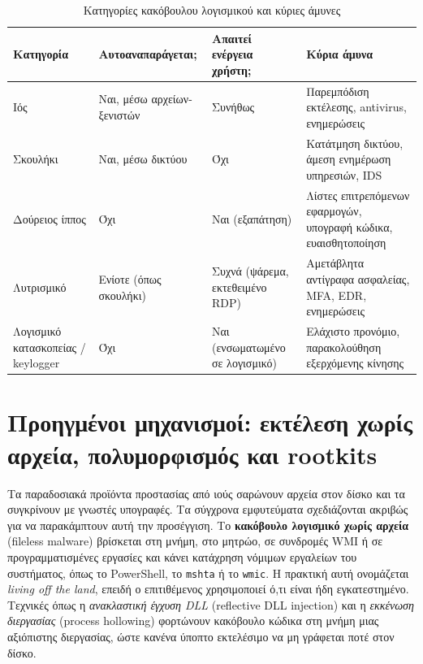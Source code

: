 \documentclass[11pt,openany]{book}
\begin{document}
\begin{table}[htbp]
  \centering\small
  \caption{Κατηγορίες κακόβουλου λογισμικού και κύριες άμυνες}
  \begin{tabularx}{\linewidth}{>{\raggedright\arraybackslash}X >{\raggedright\arraybackslash}X >{\raggedright\arraybackslash}X >{\raggedright\arraybackslash}X}
    \toprule
    \textbf{Κατηγορία} & \textbf{Αυτοαναπαράγεται;} & \textbf{Απαιτεί ενέργεια χρήστη;} & \textbf{Κύρια άμυνα} \\
    \midrule
    Ιός & Ναι, μέσω αρχείων-ξενιστών & Συνήθως & Παρεμπόδιση εκτέλεσης, antivirus, ενημερώσεις \\
    Σκουλήκι & Ναι, μέσω δικτύου & Όχι & Κατάτμηση δικτύου, άμεση ενημέρωση υπηρεσιών, IDS \\
    Δούρειος ίππος & Όχι & Ναι (εξαπάτηση) & Λίστες επιτρεπόμενων εφαρμογών, υπογραφή κώδικα, ευαισθητοποίηση \\
    Λυτρισμικό & Ενίοτε (όπως σκουλήκι) & Συχνά (ψάρεμα, εκτεθειμένο RDP) & Αμετάβλητα αντίγραφα ασφαλείας, MFA, EDR, ενημερώσεις \\
    Λογισμικό κατασκοπείας / keylogger & Όχι & Ναι (ενσωματωμένο σε λογισμικό) & Ελάχιστο προνόμιο, παρακολούθηση εξερχόμενης κίνησης \\
    \bottomrule
  \end{tabularx}
\end{table}
\section{Προηγμένοι μηχανισμοί: εκτέλεση χωρίς αρχεία, πολυμορφισμός και rootkits}\label{sec:4.2}
Τα παραδοσιακά προϊόντα προστασίας από ιούς σαρώνουν αρχεία στον δίσκο και τα συγκρίνουν με γνωστές υπογραφές. Τα σύγχρονα εμφυτεύματα σχεδιάζονται ακριβώς για να παρακάμπτουν αυτή την προσέγγιση. Το \textbf{κακόβουλο λογισμικό χωρίς αρχεία} (fileless malware) βρίσκεται στη μνήμη, στο μητρώο, σε συνδρομές WMI ή σε προγραμματισμένες εργασίες και κάνει κατάχρηση νόμιμων εργαλείων του συστήματος, όπως το PowerShell, το \texttt{mshta} ή το \texttt{wmic}. Η πρακτική αυτή ονομάζεται \emph{living off the land}, επειδή ο επιτιθέμενος χρησιμοποιεί ό,τι είναι ήδη εγκατεστημένο. Τεχνικές όπως η \emph{ανακλαστική έγχυση DLL} (reflective DLL injection) και η \emph{εκκένωση διεργασίας} (process hollowing) φορτώνουν κακόβουλο κώδικα στη μνήμη μιας αξιόπιστης διεργασίας, ώστε κανένα ύποπτο εκτελέσιμο να μη γράφεται ποτέ στον δίσκο.
\end{document}
